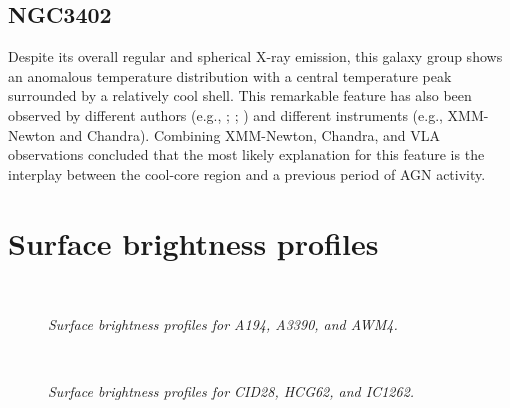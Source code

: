 \documentclass{aa} %
\begin{document}
\begin{appendix}
\subsection*{NGC3402}
Despite its overall regular and spherical X-ray emission, this galaxy group shows an anomalous temperature distribution with a central temperature peak surrounded by a relatively cool shell.
This remarkable feature has also been observed by different authors (e.g., \citealt{2006ApJ...640..691V}; \citealt{2007ApJ...658..299O}; \citealt{2009ApJ...693.1142S} \citealt{2011A&A...535A.105E}) and different instruments (e.g., XMM-Newton and Chandra). Combining XMM-Newton, Chandra, and VLA observations  \citet{2007ApJ...658..299O} concluded that the most likely explanation for this feature is the interplay between the cool-core region and a previous period of AGN activity.


\onecolumn 

\section{Surface brightness profiles} \label{SBprofiles} 
\begin{figure*}[ht]
\begin{center}
\hbox{
}
\end{center}
\vspace{-20pt}
\caption{\footnotesize{\it Surface brightness profiles for A194, A3390, and AWM4.}}
\end{figure*}


\begin{figure*}[ht]
\begin{center}
\hbox{
}
\end{center}
\vspace{-20pt}
\caption{\footnotesize{\it Surface brightness profiles for CID28, HCG62, and IC1262.}}
\end{figure*}


\end{appendix}
\end{document}

